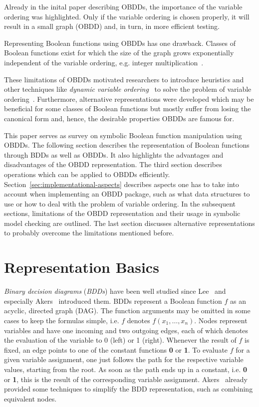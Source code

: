 \documentclass{vldb}
\begin{document}
Already in the inital paper describing OBDDs, the importance of the variable
ordering was highlighted. Only if the variable ordering is chosen properly, it
will result in a small graph (OBDD) and, in turn, in more efficient testing.

Representing Boolean functions using OBDDs has one drawback. Classes of
Boolean functions exist for which the size of the graph grows exponentially
independent of the variable ordering, e.g. integer
multiplication~\cite{BRYANT86, BRYANT91, WOELFEL01}.

These limitations of OBDDs motivated researchers to introduce heuristics and
other techniques like \textit{dynamic variable ordering}~\cite{RUDELL93} to solve
the problem of variable ordering~\cite{BOLLIG96}. Furthermore, alternative
representations were developed which may be beneficial for some classes of Boolean
functions but mostly suffer from losing the canonical form and, hence, the desirable
properties OBDDs are famous for.

This paper serves as survey on symbolic Boolean function manipulation using OBDDs.
The following section describes the representation of Boolean functions through
BDDs as well as OBDDs. It also highlights the advantages and disadvantages of the
OBDD representation. The third section describes operations which can be applied
to OBDDs efficiently. Section~\ref{sec:implementational-aspects} describes aspects
one has to take into account when implementing an OBDD package, such as what data
structures to use or how to deal with the problem of variable ordering.
In the subsequent sections, limitations of the OBDD representation and their usage
in symbolic model checking are outlined. The last section discusses alternative
representations to probably overcome the limitations mentioned before.

\section{Representation Basics}
\label{sec:representation-basics}

\textit{Binary decision diagrams} (\textit{BDDs}) have been well studied since
Lee~\cite{LEE59} and especially Akers~\cite{AKERS78} introduced them. BDDs
represent a Boolean function $f$ as an acyclic, directed graph (DAG). The function
arguments may be omitted in some cases to keep the formulas simple, i.e. $f$
denotes $f(x_1, \ldots, x_n)$. Nodes represent variables and have one incoming
and two outgoing edges, each of which denotes the evaluation of the variable to
0 (left) or 1 (right). Whenever the result of $f$ is fixed, an edge points
to one of the constant functions \textbf{0} or \textbf{1}. To evaluate $f$ for a
given variable assignment, one just follows the path for the respective variable
values, starting from the root. As soon as the path ends up in a constant, i.e.
\textbf{0} or \textbf{1}, this is the result of the corresponding variable
assignment. Akers~\cite{AKERS78} already provided some techniques to simplify the
BDD representation, such as combining equivalent nodes.
\end{document}
